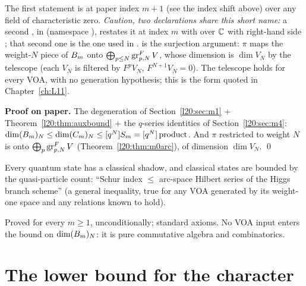 \begin{dictionary}
The first statement is at paper index $m+1$ (see the index shift above) over any field of characteristic zero.
\emph{Caution, two declarations share this short name:} a second , in
 (namespace ), restates it at index
$m$ with  over ${\mathbb{C}}$ with right-hand side ; that second one is the
one used in .  is the surjection argument: $\pi$ maps the weight-$N$ piece of
$B_m$ onto $\bigoplus_{p\le N}\operatorname{gr}^F_{p,N}V$, whose dimension is $\dim V_N$ by the telescope
 (each $V_N$ is filtered by $F^pV_N$, $F^{N+1}V_N=0$). The telescope holds
for every VOA, with no generation hypothesis; this is the form quoted in Chapter~\ref{ch:L11}.
\end{dictionary}

\textbf{Proof on paper.} The degeneration of Section~\ref{l20:sec:m1} + Theorem~\ref{l20:thm:auxbound} + the $q$-series identities of Section~\ref{l20:sec:m4}: $\dim(B_m)_N\le\dim(C_m)_N\le[q^N]S_m=[q^N]\,
\mathrm{product}$. And $\pi$ restricted to weight $N$ is onto $\bigoplus_p\operatorname{gr}^F_{p,N}V$ (Theorem~\ref{l20:thm:m0arc}),
of dimension $\dim V_N$. \qed

\begin{physics}
Every quantum state has a classical shadow, and classical states are bounded by the quasi-particle count:
``Schur index $\le$ arc-space Hilbert series of the Higgs branch scheme'' (a general inequality, true for any VOA
generated by its weight-one space and any relations known to hold).
\end{physics}

\begin{status}
Proved for every $m\ge1$, unconditionally; standard axioms. No VOA input enters the bound on $\dim(B_m)_N$:
it is pure commutative algebra and combinatorics.
\end{status}

\section{The lower bound for the character}\label{l20:sec:m6}

